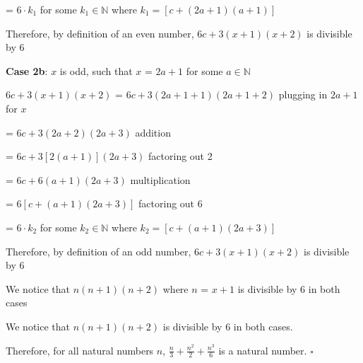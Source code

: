 \documentclass{article} %
\begin{document}
    \tabto*{5.24cm} = $6 \cdot k_{1}$ for some $k_{1} \in \mathbb{N}$ where $k_{1} = [c + (2a + 1)(a + 1)]$


    \tabto*{2cm} Therefore, by definition of an even number, $6c + 3(x+1)(x+2)$ is divisible by 6
    \vspace*{0.3cm}

    \tabto*{2cm} \textbf{Case 2b}: $x$ is odd, such that $x$ = $2a + 1$ for some $a \in \mathbb{N}$
    \vspace*{0.08cm}

    \tabto*{2cm} $6c + 3(x+1)(x+2)$ = $6c + 3(2a+1 + 1)(2a+1 + 2)$ \tabto*{10.4cm}plugging in $2a+1$ for $x$
    \vspace*{0.08cm}

    \tabto*{5.24cm} = $6c + 3(2a+2)(2a+3)$ \tabto*{10.4cm}addition
    \vspace*{0.08cm}

    \tabto*{5.24cm} = $6c + 3[2(a+1)](2a+3)$ \tabto*{10.4cm}factoring out 2
    \vspace*{0.08cm}

    \tabto*{5.24cm} = $6c + 6(a+1)(2a+3)$ \tabto*{10.4cm}multiplication
    \vspace*{0.08cm}

    \tabto*{5.24cm} = $6[c + (a+1)(2a+3)]$ \tabto*{10.4cm}factoring out 6
    \vspace*{0.08cm}
    
    \tabto*{5.24cm} = $6 \cdot k_{2}$ for some $k_{2} \in \mathbb{N}$ where $k_{2} = [c + (a+1)(2a+3)]$


    \tabto*{2cm} Therefore, by definition of an odd number, $6c + 3(x+1)(x+2)$ is divisible by 6

    \tabto*{1cm}We notice that $n(n + 1)(n + 2)$ where $n$ = $x + 1$ is divisible by 6 in both cases

    We notice that $n(n + 1)(n + 2)$ is divisible by 6 in both cases.

    \vspace*{0.2cm}

    Therefore, for all natural numbers $n$, $\frac{n}{3} + \frac{n^2}{2} + \frac{n^3}{6}$ is a natural number. $\square$

\end{document}
